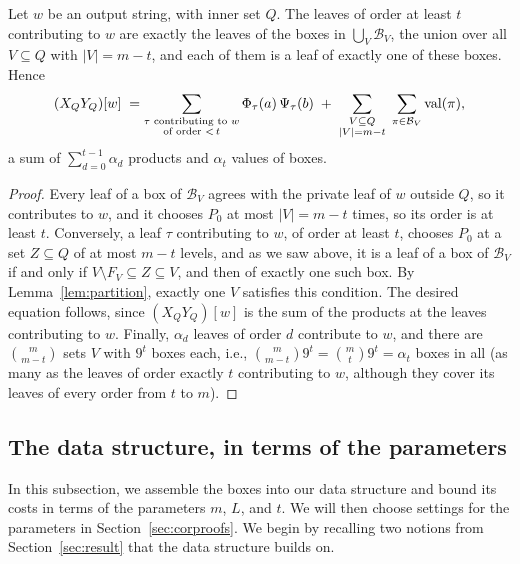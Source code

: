 \begin{lemma}\label{lem:boxes}
Let $w$ be an output string, with inner set $Q$. The leaves of order at least $t$ contributing to $w$ are exactly the leaves of the boxes in $\bigcup_V\mathcal B_V$, the union over all $V\subseteq Q$ with $|V|=m-t$, and each of them is a leaf of exactly one of these boxes. Hence
\[
(X_QY_Q)[w]\;=\sum_{\substack{\tau\text{ contributing to }w\\\text{of order }<\,t}}\Phi_\tau(a)\,\Psi_\tau(b)\;+\;\sum_{\substack{V\subseteq Q\\|V|=m-t}}\;\sum_{\pi\in\mathcal B_V}\mathrm{val}(\pi),
\]
a sum of $\sum_{d=0}^{t-1}\alpha_d$ products and $\alpha_{t}$ values of boxes.
\end{lemma}

\begin{proof}
Every leaf of a box of $\mathcal B_V$ agrees with the private leaf of $w$ outside $Q$, so it contributes to $w$, and it chooses $P_0$ at most $|V|=m-t$ times, so its order is at least $t$. Conversely, a leaf $\tau$ contributing to $w$, of order at least $t$, chooses $P_0$ at a set $Z\subseteq Q$ of at most $m-t$ levels, and as we saw above, it is a leaf of a box of $\mathcal B_V$ if and only if $V\setminus F_V\subseteq Z\subseteq V$, and then of exactly one such box. By Lemma~\ref{lem:partition}, exactly one $V$ satisfies this condition. The desired equation follows, since $(X_QY_Q)[w]$ is the sum of the products at the leaves contributing to $w$. Finally, $\alpha_d$ leaves of order $d$ contribute to $w$, and there are $\binom m{m-t}$ sets $V$ with $9^t$ boxes each, i.e., $\binom m{m-t}9^t=\binom mt9^t=\alpha_t$ boxes in all (as many as the leaves of order exactly $t$ contributing to $w$, although they cover its leaves of every order from $t$ to $m$).
\end{proof}

\subsection{The data structure, in terms of the parameters}\label{sec:single}

In this subsection, we assemble the boxes into our data structure and bound its costs in terms of the parameters $m$, $L$, and $t$. We will then choose settings for the parameters in Section~\ref{sec:corproofs}. We begin by recalling two notions from Section~\ref{sec:result} that the data structure builds on.

